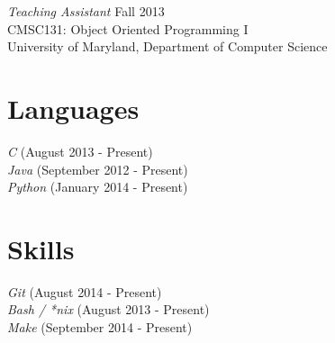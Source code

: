 \documentclass[margin]{res}
\begin{document}
\begin{resume}
	{\sl Teaching Assistant } \hfill Fall 2013 \\
	CMSC131: Object Oriented Programming I \\
	University of Maryland, Department of Computer Science \\ 
	
\section{Languages} {\sl C }\hfill (August 2013 - Present) \\
	{\sl Java } \hfill (September 2012 - Present) \\
	{\sl Python } \hfill (January 2014 - Present) \\
	
\section{Skills} {\sl Git } \hfill (August 2014 - Present) \\
	{\sl Bash / *nix } \hfill (August 2013 - Present) \\
	{\sl Make } \hfill (September 2014 - Present)

\end{resume}
\end{document}
